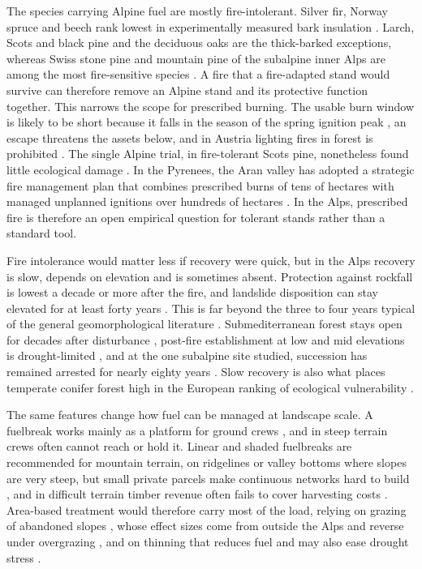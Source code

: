 \documentclass[11pt,a4paper]{article}
\begin{document}
The species carrying Alpine fuel are mostly fire-intolerant. Silver fir, Norway spruce and beech rank lowest in experimentally measured bark insulation \citep{mutterer_bark_2026}. Larch, Scots and black pine and the deciduous oaks are the thick-barked exceptions, whereas Swiss stone pine and mountain pine of the subalpine inner Alps are among the most fire-sensitive species \citep{dupire_vulnerability_2019}. A fire that a fire-adapted stand would survive can therefore remove an Alpine stand and its protective function together. This narrows the scope for prescribed burning. The usable burn window is likely to be short because it falls in the season of the spring ignition peak \citep{muller_forest_2020}, an escape threatens the assets below, and in Austria lighting fires in forest is prohibited \citep{neumann_fuel_2022}. The single Alpine trial, in fire-tolerant Scots pine, nonetheless found little ecological damage \citep{gamba_prescribed_2025}. In the Pyrenees, the Aran valley has adopted a strategic fire management plan that combines prescribed burns of tens of hectares with managed unplanned ignitions over hundreds of hectares \citep{oliveres_path_2025}. In the Alps, prescribed fire is therefore an open empirical question for tolerant stands rather than a standard tool.

Fire intolerance would matter less if recovery were quick, but in the Alps recovery is slow, depends on elevation and is sometimes absent. Protection against rockfall is lowest a decade or more after the fire, and landslide disposition can stay elevated for at least forty years \citep{maringer_temporal_2016, gehring_shallow_2019}. This is far beyond the three to four years typical of the general geomorphological literature \citep{santi_wildfire_2022}. Submediterranean forest stays open for decades after disturbance \citep{stritih_alternative_2023}, post-fire establishment at low and mid elevations is drought-limited \citep{moser_potential_2010}, and at the one subalpine site studied, succession has remained arrested for nearly eighty years \citep{degiuli_arrested_2024}. Slow recovery is also what places temperate conifer forest high in the European ranking of ecological vulnerability \citep{arrogantefunes_mapping_2024}.

The same features change how fuel can be managed at landscape scale. A fuelbreak works mainly as a platform for ground crews \citep{ortega_modeling_2024}, and in steep terrain crews often cannot reach or hold it. Linear and shaded fuelbreaks are recommended for mountain terrain, on ridgelines or valley bottoms where slopes are very steep, but small private parcels make continuous networks hard to build \citep{ascoli_firebreak_2018, gorrizmifsud_current_2026}, and in difficult terrain timber revenue often fails to cover harvesting costs \citep{dinca_timber_2025}. Area-based treatment would therefore carry most of the load, relying on grazing of abandoned slopes \citep{rouetleduc_effects_2021}, whose effect sizes come from outside the Alps and reverse under overgrazing \citep{xu_how_2026}, and on thinning that reduces fuel and may also ease drought stress \citep{giuggiola_droughtinduced_2010}.
\end{document}
